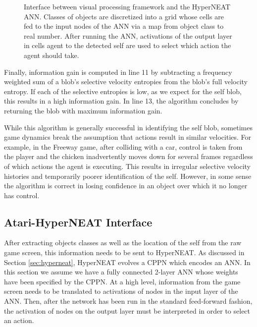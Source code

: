\documentclass{acm_proc_article-sp}
\begin{document}
\begin{figure}
 \caption{Interface between visual processing framework and the HyperNEAT ANN. Classes of objects are discretized into a grid whose cells are fed to the input nodes of the ANN via a map from object class to real number. After running the ANN, activations of the output layer in cells agent to the detected self are used to select which action the agent should take.}
 \label{fig:interface}
\end{figure}

Finally, information gain is computed in line 11 by subtracting a frequency weighted sum of a blob's selective velocity entropies from the blob's full velocity entropy. If each of the selective entropies is low, as we expect for the self blob, this results in a high information gain. In line 13, the algorithm concludes by returning the blob with maximum information gain.

While this algorithm is generally successful in identifying the self blob, sometimes game dynamics break the assumption that actions result in similar velocities. For example, in the Freeway game, after colliding with a car, control is taken from the player and the chicken inadvertently moves down for several frames regardless of which actions the agent is executing. This results in irregular selective velocity histories and temporarily poorer identification of the self. However, in some sense the algorithm is correct in losing confidence in an object over which it no longer has control.

\subsection{Atari-HyperNEAT Interface}
\label{sec:interface}
After extracting objects classes as well as the location of the self from the raw game screen, this information needs to be sent to HyperNEAT. As discussed in Section \ref{sec:hyperneat}, HyperNEAT evolves a CPPN which encodes an ANN. In this section we assume we have a fully connected 2-layer ANN whose weights have been specified by the CPPN. At a high level, information from the game screen needs to be translated to activations of nodes in the input layer of the ANN. Then, after the network has been run in the standard feed-forward fashion, the activation of nodes on the output layer must be interpreted in order to select an action.
\end{document}
